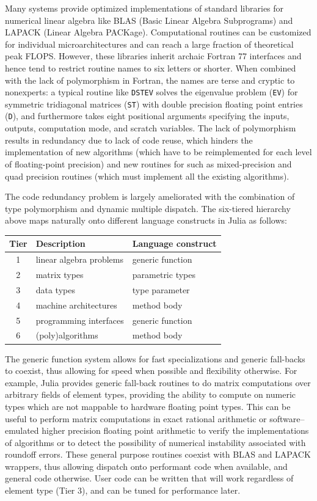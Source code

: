 \documentclass[pldi]{sigplanconf-pldi15}
\begin{document}
Many systems provide optimized implementations of standard libraries for
numerical linear algebra like BLAS (Basic Linear Algebra Subprograms) and
LAPACK (Linear Algebra PACKage). Computational routines can be customized
for individual microarchitectures and can reach a large fraction of
theoretical peak FLOPS. However, these libraries inherit archaic Fortran 77
interfaces and hence tend to restrict routine names to six letters or shorter.
When combined with the lack of polymorphism in Fortran, the names are terse and
cryptic to nonexperts: a typical routine like \verb|DSTEV| solves the
eigenvalue problem (\verb|EV|) for symmetric tridiagonal matrices (\verb|ST|)
with double precision floating point entries (\verb|D|), and furthermore takes
eight positional arguments specifying the inputs, outputs, computation mode,
and scratch variables. The lack of polymorphism results in redundancy due to
lack of code reuse, which hinders the implementation of new algorithms (which
have to be reimplemented for each level of floating-point precision) and new
routines for such as mixed-precision and quad precision routines (which must
implement all the existing algorithms).

The code redundancy problem is largely ameliorated with the combination of type
polymorphism and dynamic multiple dispatch. The six-tiered hierarchy above maps
naturally onto different language constructs in Julia as follows:

\vspace{12pt}
\begin{tabular}{c l l}
	\hline
	Tier & Description & Language construct \\ \hline
	1 & linear algebra problems & generic function \\
	2 & matrix types & parametric types \\
	3 & data types & type parameter \\
	4 & machine architectures & method body \\
	5 & programming interfaces & generic function \\
	6 & (poly)algorithms & method body \\ \hline
\end{tabular}
\vspace{12pt}

The generic function system allows for fast specializations and generic
fall-backs to coexist, thus allowing for speed when possible and flexibility
otherwise. For example, Julia provides generic fall-back routines to do matrix
computations over arbitrary fields of element types, providing the ability to
compute on numeric types which are not mappable to hardware floating point
types. This can be useful to perform matrix computations in exact rational
arithmetic or software--emulated higher precision floating point arithmetic to
verify the implementations of algorithms or to detect the possibility of
numerical instability associated with roundoff errors. These general purpose
routines coexist with BLAS and LAPACK wrappers, thus allowing dispatch onto
performant code when available, and general code otherwise. User code can be
written that will work regardless of element type (Tier 3), and can be tuned
for performance later.
\end{document}
